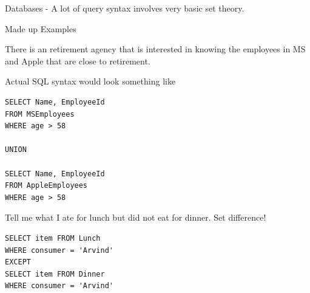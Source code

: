 \documentclass[12pt]{article}
\begin{document}
Databases - A lot of query syntax involves very basic set theory. 

Made up Examples

There is an retirement agency that is interested in knowing the employees in MS and Apple that are close to retirement. 

Actual SQL syntax would look something like

\begin{verbatim}
SELECT Name, EmployeeId
FROM MSEmployees
WHERE age > 58

UNION

SELECT Name, EmployeeId
FROM AppleEmployees
WHERE age > 58
\end{verbatim}

Tell me what I ate for lunch but did not eat for dinner. Set difference!

\begin{verbatim}
SELECT item FROM Lunch
WHERE consumer = 'Arvind'
EXCEPT
SELECT item FROM Dinner
WHERE consumer = 'Arvind'
\end{verbatim}
\end{document}
